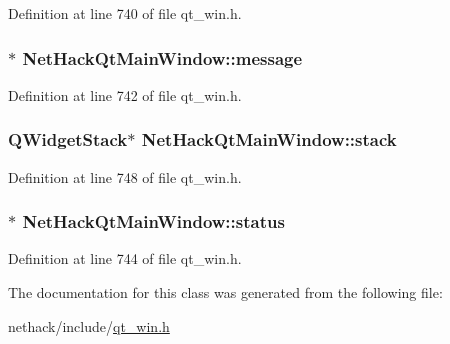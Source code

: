 Definition at line 740 of file qt\+\_\+win.\+h.

\hypertarget{classNetHackQtMainWindow_a80922b351e3153d352c7eab13b0a5105}{
\subsubsection[{message}]{$\ast$ Net\+Hack\+Qt\+Main\+Window\+::message\hspace{0.3cm}{\ttfamily [private]}}}\label{classNetHackQtMainWindow_a80922b351e3153d352c7eab13b0a5105}


Definition at line 742 of file qt\+\_\+win.\+h.

\hypertarget{classNetHackQtMainWindow_ab8252d54de11cfecbb49a76434057797}{
\subsubsection[{stack}]{\setlength{\rightskip}{0pt plus 5cm}Q\+Widget\+Stack$\ast$ Net\+Hack\+Qt\+Main\+Window\+::stack\hspace{0.3cm}{\ttfamily [private]}}}\label{classNetHackQtMainWindow_ab8252d54de11cfecbb49a76434057797}


Definition at line 748 of file qt\+\_\+win.\+h.

\hypertarget{classNetHackQtMainWindow_ad809c0e1b9c110340bd2b5af80c109d3}{
\subsubsection[{status}]{$\ast$ Net\+Hack\+Qt\+Main\+Window\+::status\hspace{0.3cm}{\ttfamily [private]}}}\label{classNetHackQtMainWindow_ad809c0e1b9c110340bd2b5af80c109d3}


Definition at line 744 of file qt\+\_\+win.\+h.



The documentation for this class was generated from the following file\+:\begin{DoxyCompactItemize}
\item 
nethack/include/\hyperlink{qt__win_8h}{qt\+\_\+win.\+h}\end{DoxyCompactItemize}

